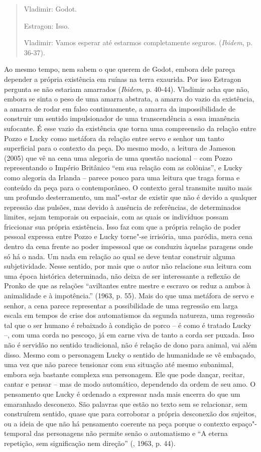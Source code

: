 {\begin{quote}
Vladimir: Godot.

Estragon: Isso.

Vladimir: Vamos esperar até estarmos completamente seguros.
(\emph{Ibidem}, p. 36-37).
\end{quote}

Ao mesmo tempo, nem sabem o que querem de Godot, embora dele pareça
depender a própria existência em ruínas na terra exaurida. Por isso
Estragon pergunta se não estariam amarrados (\emph{Ibidem}, p. 40-44).
Vladimir acha que não, embora se sinta o peso de uma amarra abstrata, a
amarra do vazio da existência, a amarra de rodar em falso continuamente,
a amarra da impossibilidade de construir um sentido impulsionador de uma
transcendência a essa imanência sufocante. É esse vazio da existência
que torna uma compreensão da relação entre Pozzo e Lucky como metáfora
da relação entre servo e senhor um tanto superficial para o contexto da
peça. Do mesmo modo, a leitura de Jameson (2005) que vê na cena uma
alegoria de uma questão nacional -- com Pozzo representando o Império
Britânico ``em sua relação com as colônias'', e Lucky como alegoria da
Irlanda -- parece pouco para uma leitura que traga forma e conteúdo da
peça para o contemporâneo. O contexto geral transmite muito mais um
profundo desterramento, um mal"-estar de existir que não é devido a
qualquer repressão das pulsões, mas devido à ausência de referências, de
determinados limites, sejam temporais ou espaciais, com as quais os
indivíduos possam friccionar sua própria existência. Isso faz com que a
própria relação de poder pessoal expressa entre Pozzo e Lucky torne"-se
irrisória, uma paródia, mera cena dentro da cena frente ao poder
impessoal que os conduziu àquelas paragens onde só há o nada. Um nada em
relação ao qual se deve tentar construir alguma subjetividade. Nesse
sentido, por mais que o autor não relacione sua leitura com uma época
histórica determinada, não deixa de ser interessante a reflexão de
Pronko de que as relações ``aviltantes entre mestre e escravo os reduz a
ambos à animalidade e à impotência.'' (1963, p. 55). Mais do que uma
metáfora de servo e senhor, a cena parece representar a possibilidade de
uma regressão em larga escala em tempos de crise dos automatismos da
segunda natureza, uma regressão tal que o ser humano é rebaixado à
condição de porco -- é como é tratado Lucky --, com uma corda no
pescoço, já em carne viva de tanto a corda ser puxada. Isso não é
servidão no sentido tradicional, não é relação de dono para animal, vai
além disso. Mesmo com o personagem Lucky o sentido de humanidade se vê
embaçado, uma vez que não parece tensionar com sua situação até mesmo
subanimal, embora seja bastante complexa sua personagem. Ele que pode
dançar, recitar, cantar e pensar -- mas de modo automático, dependendo
da ordem de seu amo. O pensamento que Lucky é ordenado a expressar nada
mais encerra do que um emaranhado desconexo. São palavras que estão no
texto sem se relacionar, sem construírem sentido, quase que para
corroborar a própria desconexão dos sujeitos, ou a ideia de que não há
pensamento coerente na peça porque o contexto espaço"-temporal das
personagens não permite senão o automatismo e ``A eterna repetição, sem
significação nem direção'' (, 1963, p. 44).

}

